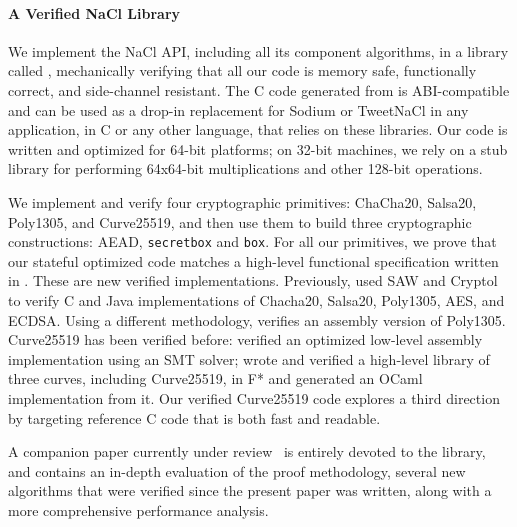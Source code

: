 \documentclass[acmsmall,review,anonymous]{acmart}\settopmatter{printfolios=true}
\begin{document}
\paragraph*{A Verified NaCl Library}
We implement the NaCl API, including all its component algorithms, 
in a \lowstar library called \haclstar, mechanically verifying that 
all our code is memory safe, functionally correct,  and side-channel resistant.
%
The C code generated from \haclstar is ABI-compatible and can be used as a drop-in replacement for
Sodium or TweetNaCl in any application, in C or any other language, that relies on these libraries.
%
Our code is written and optimized for 64-bit platforms; on 32-bit
machines, we rely on a stub library for performing 64x64-bit 
multiplications and other 128-bit operations.

We implement and verify four cryptographic primitives:
ChaCha20, Salsa20, Poly1305, and Curve25519, and then use them to
build three cryptographic constructions: AEAD, \texttt{secretbox} 
and \texttt{box}. 
%
For all our primitives, we prove that our stateful optimized code
matches a high-level functional specification written in \fstar.
%
These are new verified implementations. Previously, \citet{saw-cryptol} used SAW
and Cryptol to verify C and Java implementations of Chacha20,
Salsa20, Poly1305, AES, and ECDSA. Using a different methodology, \citet{vale}
verifies an assembly version of Poly1305.
%
Curve25519 has been verified before:
%
\citet{chen2014verifying} verified an optimized 
low-level assembly implementation using an SMT solver;
%
\citet{ZBB16} wrote and verified a high-level
library of three curves, including Curve25519, in F* and generated an
OCaml implementation from it.
%
Our verified Curve25519 code explores a third direction by targeting 
reference C code that is both fast and readable.

A companion paper currently under review~\cite{haclstar} is entirely devoted to the \haclstar
library, and contains an in-depth evaluation of the proof methodology, several
new algorithms that were verified since the present paper was written, along
with a more comprehensive performance analysis.
\end{document}
